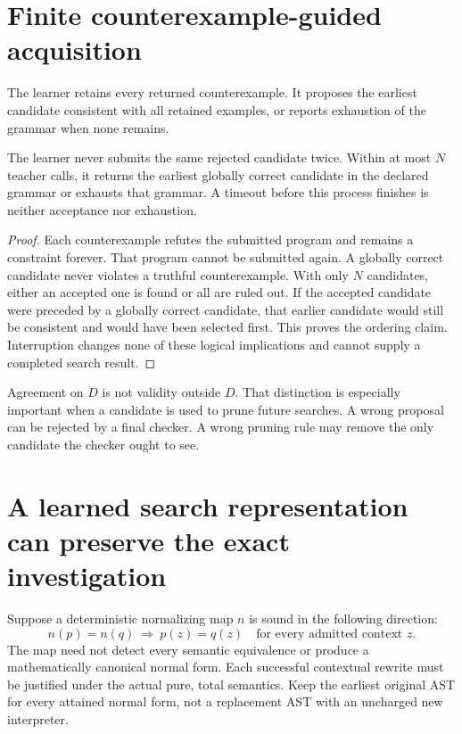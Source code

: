 \section{Finite counterexample-guided acquisition}
The learner retains every returned counterexample. It proposes the earliest candidate consistent with all retained examples, or reports exhaustion of the grammar when none remains.

\begin{proposition}\label{r:cegis}
The learner never submits the same rejected candidate twice. Within at most $N$ teacher calls, it returns the earliest globally correct candidate in the declared grammar or exhausts that grammar. A timeout before this process finishes is neither acceptance nor exhaustion.
\end{proposition}
\begin{proof}
Each counterexample refutes the submitted program and remains a constraint forever. That program cannot be submitted again. A globally correct candidate never violates a truthful counterexample. With only $N$ candidates, either an accepted one is found or all are ruled out. If the accepted candidate were preceded by a globally correct candidate, that earlier candidate would still be consistent and would have been selected first. This proves the ordering claim. Interruption changes none of these logical implications and cannot supply a completed search result.
\end{proof}

Agreement on $D$ is not validity outside $D$. That distinction is especially important when a candidate is used to prune future searches. A wrong proposal can be rejected by a final checker. A wrong pruning rule may remove the only candidate the checker ought to see.

\section{A learned search representation can preserve the exact investigation}
Suppose a deterministic normalizing map $n$ is sound in the following direction:
\[
n(p)=n(q)\ \Longrightarrow\ p(z)=q(z)\quad\text{for every admitted context }z.
\]
The map need not detect every semantic equivalence or produce a mathematically canonical normal form. Each successful contextual rewrite must be justified under the actual pure, total semantics. Keep the earliest original AST for every attained normal form, not a replacement AST with an uncharged new interpreter.

